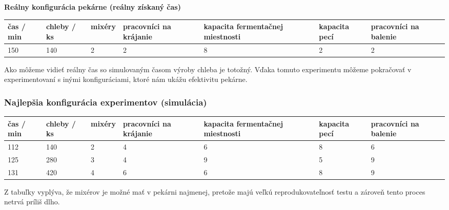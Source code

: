 \documentclass[a4paper, 10pt]{article}
\begin{document}
    \textbf{Reálny konfigurácia pekárne (reálny získaný čas)}
    \begin{center}
        \begin{tabular}{ |p{2cm}|p{2cm}|p{2cm}|p{2cm}|p{2cm}|p{2cm}|p{2cm}| }
            \hline
            čas / min & chleby / ks & mixéry & pracovníci na krájanie & kapacita fermentačnej miestnosti & kapacita pecí & pracovníci na balenie \\
            \hline\hline
            150       & 140         & 2      & 2                      & 8                                & 2             & 2                     \\ \hline
        \end{tabular}
    \end{center}

    Ako môžeme vidieť reálny čas so simulovaným časom výroby chleba je totožný. Vďaka tomuto experimentu
    môžeme pokračovať v experimentovaní s inými konfiguráciami, ktoré nám ukážu efektivitu pekárne.

    \subsubsection{Najlepšia konfigurácia experimentov (simulácia)}
    \begin{center}
        \begin{tabular}{ |p{2cm}|p{2cm}|p{2cm}|p{2cm}|p{2cm}|p{2cm}|p{2cm}| }
            \hline
            čas / min & chleby / ks & mixéry & pracovníci na krájanie & kapacita fermentačnej miestnosti & kapacita pecí & pracovníci na balenie \\
            \hline\hline
            112       & 140         & 2      & 4                      & 6                                & 8             & 6                     \\ \hline
            125       & 280         & 3      & 4                      & 9                                & 5             & 9                     \\ \hline
            131       & 420         & 4      & 6                      & 6                                & 8             & 9                     \\ \hline
        \end{tabular}
    \end{center}


    Z tabuľky vyplýva, že mixérov je možné
    mať v pekárni najmenej, pretože majú veľkú reprodukovateľnosť testu a zároveň
    tento proces netrvá príliš dlho.
\end{document}
